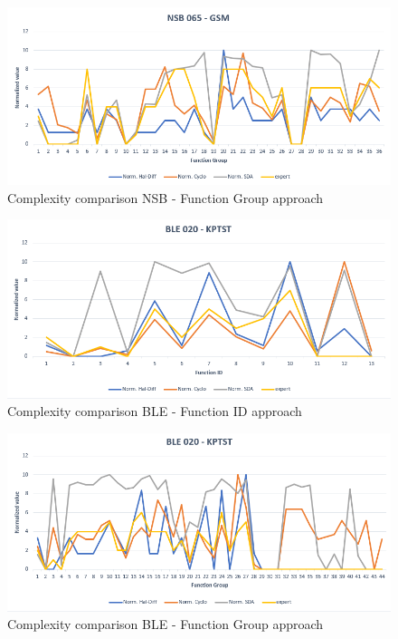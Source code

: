 \begin{figure}[ht] 	
	\centering
	\includegraphics[width=1\textwidth]{graphic/NSB-GSM_FG_plot.png}
	\caption{Complexity comparison NSB - Function Group approach}
	\label{fig:plot_gsm_fg}
\end{figure}

\begin{figure}[ht]
	\centering
	\includegraphics[width=1\textwidth]{graphic/BLE-KPTST_plot.png}	
	\caption{Complexity comparison BLE - Function ID approach}
	\label{fig:plot_ble_fid}
\end{figure}

\begin{figure}[ht]	
	\centering
	\includegraphics[width=1\textwidth]{graphic/BLE-KPTST_FG_plot.png}
	\caption{Complexity comparison BLE - Function Group approach}
	\label{fig:plot_ble_fg}
\end{figure}